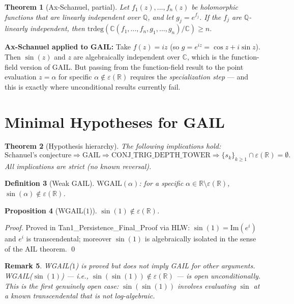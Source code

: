 \documentclass[11pt]{article}
\newtheorem{theorem}{Theorem}
\newtheorem{proposition}[theorem]{Proposition}
\newtheorem{definition}[theorem]{Definition}
\newtheorem{remark}[theorem]{Remark}
\begin{document}
\begin{theorem}[Ax-Schanuel, partial]
Let $f_1(z), \ldots, f_n(z)$ be holomorphic functions that are linearly independent
over $\mathbb{Q}$, and let $g_j = e^{f_j}$. If the $f_j$ are $\mathbb{Q}$-linearly independent,
then $\mathrm{trdeg}(\mathbb{C}(f_1,\ldots,f_n,g_1,\ldots,g_n)/\mathbb{C}) \geq n$.
\end{theorem}

\textbf{Ax-Schanuel applied to GAIL:} Take $f(z) = iz$ (so $g = e^{iz} = \cos z + i\sin z$).
Then $\sin(z)$ and $z$ are algebraically independent over $\mathbb{C}$, which is the
function-field version of GAIL. But passing from the function-field result to
the point evaluation $z = \alpha$ for specific $\alpha \notin \varepsilon(\mathbb{R})$
requires the \emph{specialization step} — and this is exactly where
unconditional results currently fail.

\section{Minimal Hypotheses for GAIL}

\begin{theorem}[Hypothesis hierarchy]
The following implications hold:
\[
\text{Schanuel's conjecture} \Rightarrow \mathrm{GAIL} \Rightarrow \mathrm{CONJ\_TRIG\_DEPTH\_TOWER}
\Rightarrow \{s_k\}_{k\geq 1} \cap \varepsilon(\mathbb{R}) = \emptyset.
\]
All implications are strict (no known reversal).
\end{theorem}

\begin{definition}[Weak GAIL]
$\mathrm{WGAIL}(\alpha)$: for a specific $\alpha \in \mathbb{R} \setminus \varepsilon(\mathbb{R})$,
$\sin(\alpha) \notin \varepsilon(\mathbb{R})$.
\end{definition}

\begin{proposition}[WGAIL($1$)]
$\sin(1) \notin \varepsilon(\mathbb{R})$.
\end{proposition}

\begin{proof}
Proved in Tan1\_Persistence\_Final\_Proof via HLW: $\sin(1) = \mathrm{Im}(e^i)$
and $e^i$ is transcendental; moreover $\sin(1)$ is algebraically isolated
in the sense of the AIL theorem. \qed
\end{proof}

\begin{remark}
WGAIL($1$) is proved but does not imply GAIL for other arguments.
WGAIL($\sin(1)$) — i.e., $\sin(\sin(1)) \notin \varepsilon(\mathbb{R})$ — is open unconditionally.
This is the first genuinely open case: $\sin(\sin(1))$ involves evaluating
$\sin$ at a known transcendental that is not log-algebraic.
\end{remark}
\end{document}
